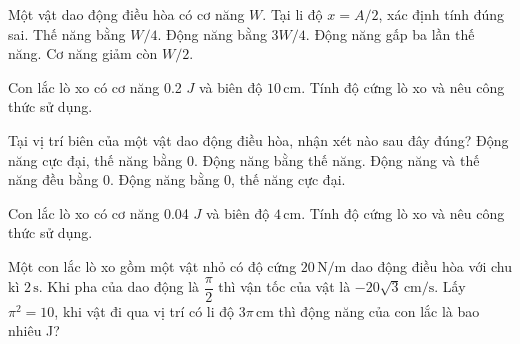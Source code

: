 \begin{ex}
Một vật dao động điều hòa có cơ năng $W$. Tại li độ $x=A/2$, xác định tính đúng sai.
\choiceTF
{\True Thế năng bằng $W/4$.}
{\True Động năng bằng $3W/4$.}
{\True Động năng gấp ba lần thế năng.}
{Cơ năng giảm còn $W/2$.}
\end{ex}

\begin{ex}
Con lắc lò xo có cơ năng 0.2 $J$ và biên độ $10\,\text{cm}$. Tính độ cứng lò xo và nêu công thức sử dụng.
\choiceTF

\end{ex}


\begin{ex}
Tại vị trí biên của một vật dao động điều hòa, nhận xét nào sau đây đúng?
\choice
{Động năng cực đại, thế năng bằng 0.}
{Động năng bằng thế năng.}
{Động năng và thế năng đều bằng 0.}
{\True Động năng bằng 0, thế năng cực đại.}
\end{ex}


\begin{ex}
Con lắc lò xo có cơ năng 0.04 $J$ và biên độ $4\,\text{cm}$. Tính độ cứng lò xo và nêu công thức sử dụng.
\choiceTF

\end{ex}

\begin{ex}
Một con lắc lò xo gồm một vật nhỏ có độ cứng $20\,\text{N/m}$ dao động điều hòa với chu kì $2\,\text{s}$. Khi pha của dao động là $\dfrac{\pi}{2}$ thì vận tốc của vật là $-20\sqrt{3}\,\text{cm/s}$. Lấy $\pi^2=10$, khi vật đi qua vị trí có li độ $3\pi\,\text{cm}$ thì động năng của con lắc là bao nhiêu J?
\end{ex}

